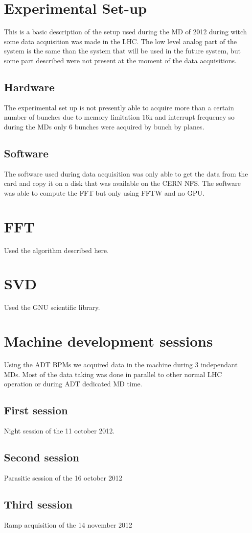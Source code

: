\section{Experimental Set-up}

This is a basic description of the setup used during the \gls{MD} of 2012 during witch some data acquisition was made in the \gls{LHC}. The low level analog part of the system is the same than the system that will be used in the future system, but some part described were not present at the moment of the data acquisitions.

\subsection{Hardware}

The experimental set up is not presently able to acquire more than a certain number of bunches due to memory limitation 16k and interrupt frequency so during the \glspl{MD} only 6 bunches were acquired by bunch by planes.

\subsection{Software}

The software used during data acquisition was only able to get the data from the card and copy it on a disk that was available on the \gls{CERN} \gls{NFS}. The software was able to compute the \gls{FFT} but only using \gls{FFTW} and no \gls{GPU}.

\section{FFT}

Used the algorithm described here\cite{Govindaraju07}.

\section{SVD}

Used the GNU scientific library.

\section{Machine development sessions}

Using the \gls{ADT} \glspl{BPM} we acquired data in the machine during 3 independant \glspl{MD}. Most of the data taking was done in parallel to other normal LHC operation or during \gls{ADT} dedicated \gls{MD} time.

\subsection{First session}

Night session of the 11 october 2012.

\subsection{Second session}

Parasitic session of the 16 october 2012

\subsection{Third session}

Ramp acquisition of the 14 november 2012

